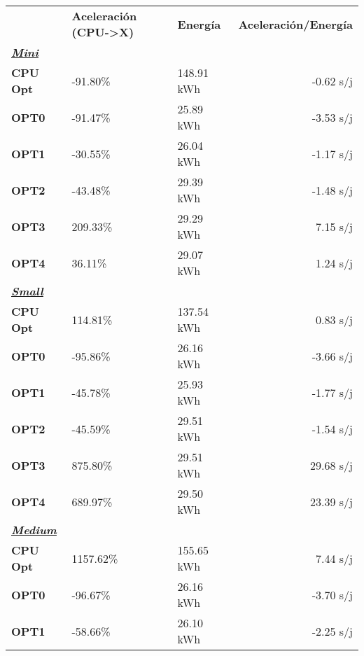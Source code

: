 \begin{table}[H]
    \centering
    \begin{tabular}{lllr}
    \rowcolor[HTML]{DAE8FC} \ & \textbf{Aceleración (CPU->X)} & \textbf{	Energía} & \textbf{	Aceleración/Energía} \\
    \cellcolor[HTML]{DAE8FC} \textbf{\textbf{{\emph{{\underline{{Mini}}}}}}} & &	&	 \\
    \rowcolor[HTML]{EFEFEF} \cellcolor[HTML]{DAE8FC} \textbf{CPU Opt} &-91.80\%  &	148.91 kWh  &	-0.62 s/j \\
    \cellcolor[HTML]{DAE8FC} \textbf{OPT0} & -91.47\%  &	25.89 kWh  &	-3.53 s/j \\
    \rowcolor[HTML]{EFEFEF} \cellcolor[HTML]{DAE8FC} \textbf{OPT1} &-30.55\%  &	26.04 kWh  &	-1.17 s/j \\
    \cellcolor[HTML]{DAE8FC} \textbf{OPT2} & -43.48\%  &	29.39 kWh  &	-1.48 s/j \\
    \rowcolor[HTML]{EFEFEF} \cellcolor[HTML]{DAE8FC} \textbf{OPT3} &209.33\%  &	29.29 kWh  &	7.15 s/j \\
    \cellcolor[HTML]{DAE8FC} \textbf{OPT4} & 36.11\%  &	29.07 kWh  &	1.24 s/j \\
    \rowcolor[HTML]{EFEFEF} \cellcolor[HTML]{DAE8FC} \textbf{\textbf{{\emph{{\underline{{Small}}}}}}} &&	&	 \\
    \cellcolor[HTML]{DAE8FC} \textbf{CPU Opt} & 114.81\%  &	137.54 kWh  &	0.83 s/j \\
    \rowcolor[HTML]{EFEFEF} \cellcolor[HTML]{DAE8FC} \textbf{OPT0} &-95.86\%  &	26.16 kWh  &	-3.66 s/j \\
    \cellcolor[HTML]{DAE8FC} \textbf{OPT1} & -45.78\%  &	25.93 kWh  &	-1.77 s/j \\
    \rowcolor[HTML]{EFEFEF} \cellcolor[HTML]{DAE8FC} \textbf{OPT2} &-45.59\%  &	29.51 kWh  &	-1.54 s/j \\
    \cellcolor[HTML]{DAE8FC} \textbf{OPT3} & 875.80\%  &	29.51 kWh  &	29.68 s/j \\
    \rowcolor[HTML]{EFEFEF} \cellcolor[HTML]{DAE8FC} \textbf{OPT4} &689.97\%  &	29.50 kWh  &	23.39 s/j \\
    \cellcolor[HTML]{DAE8FC} \textbf{\textbf{{\emph{{\underline{{Medium}}}}}}} & &	&	 \\
    \rowcolor[HTML]{EFEFEF} \cellcolor[HTML]{DAE8FC} \textbf{CPU Opt} &1157.62\%  &	155.65 kWh  &	7.44 s/j \\
    \cellcolor[HTML]{DAE8FC} \textbf{OPT0} & -96.67\%  &	26.16 kWh  &	-3.70 s/j \\
    \rowcolor[HTML]{EFEFEF} \cellcolor[HTML]{DAE8FC} \textbf{OPT1} &-58.66\%  &	26.10 kWh  &	-2.25 s/j \\

\end{tabular}
\end{table}

